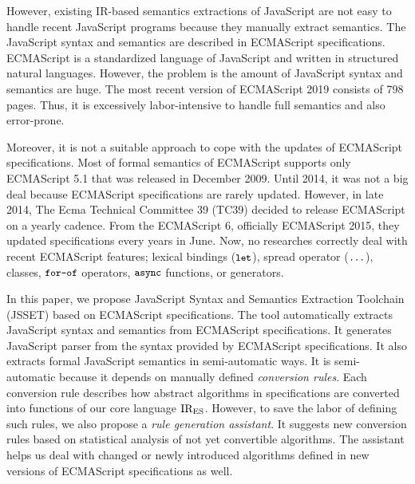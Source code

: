 However, existing IR-based semantics extractions of JavaScript are not easy to
handle recent JavaScript programs because they manually extract semantics.
The JavaScript syntax and semantics are described in ECMAScript specifications.
ECMAScript is a standardized language of JavaScript and written in structured natural languages.
However, the problem is the amount of JavaScript syntax and semantics are huge.
The most recent version of ECMAScript 2019 consists of 798 pages.
Thus, it is excessively labor-intensive to handle full semantics and also error-prone.

Moreover, it is not a suitable approach to cope with the updates of ECMAScript specifications.
Most of formal semantics of ECMAScript supports only ECMAScript 5.1 that was
released in December 2009. Until 2014, it was not a big deal because ECMAScript
specifications are rarely updated. However, in late 2014, The Ecma Technical
Committee 39 (TC39) decided to release ECMAScript on a yearly cadence. From the
ECMAScript 6, officially ECMAScript 2015, they updated specifications every years
in June. Now, no researches correctly deal with recent ECMAScript features;
lexical bindings (\( \texttt{\small let} \)), spread operator (\( \texttt{\small...} \)),
classes, \( \texttt{\small for-of} \) operators, \( \texttt{\small async} \) functions, or generators.

In this paper, we propose JavaScript Syntax and Semantics Extraction Toolchain (JSSET)
based on ECMAScript specifications. The tool automatically extracts JavaScript
syntax and semantics from ECMAScript specifications. It generates JavaScript parser
from the syntax provided by ECMAScript specifications. It also extracts formal
JavaScript semantics in semi-automatic ways. It is semi-automatic because
it depends on manually defined \textit{conversion rules}. Each conversion rule describes how abstract
algorithms in specifications are converted into functions of our core language \( \text{IR}_\text{ES} \).
However, to save the labor of defining such rules, we also propose a \textit{rule generation assistant}.
It suggests new conversion rules based on statistical analysis of not yet convertible algorithms.
The assistant helps us deal with changed or newly introduced algorithms defined in new versions of
ECMAScript specifications as well.

